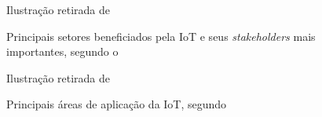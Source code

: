 \documentclass[pdftex, brazil, 12pt, twoside]{article}
\newcommand{\ingles}[1]{\textit{#1}}
\begin{document}
\begin{figure}[!h]
  \begin{center}
    \caption{Principais setores beneficiados pela IoT e seus \ingles{stakeholders}
      mais importantes, segundo o~\citet{IEEEIoTDefinition}}
    \label{fig:aplicacoes-iot-2}
    
    \footnotesize{Ilustração retirada de~\citet{IEEEIoTDefinition}}
  \end{center}
\end{figure}

\begin{figure}[!h]
  \begin{center}
    \caption{Principais áreas de aplicação da IoT, segundo~\citet{McKinseyIoTHype}}
    \label{fig:aplicacoes-iot-3}
    
    \footnotesize{Ilustração retirada de~\citet{McKinseyIoTHype}}
  \end{center}
\end{figure}
\end{document}
